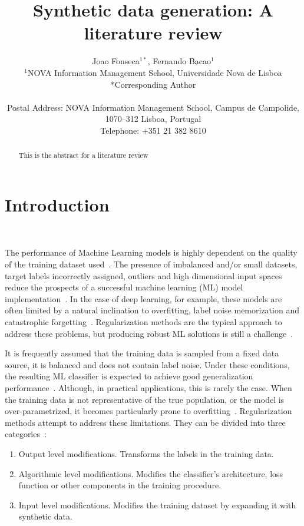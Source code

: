 \documentclass[parskip=full]{scrartcl}
\title{Synthetic data generation: A literature review}
\author{%
	Joao Fonseca\(^{1*}\), Fernando Bacao\(^{1}\)
	\\
	\small{\(^{1}\)NOVA Information Management School, Universidade Nova de Lisboa}
	\\
	\small{*Corresponding Author}
	\\
	\\
	\small{Postal Address: NOVA Information Management School, Campus de
    Campolide, 1070--312 Lisboa, Portugal}
	\\
	\small{Telephone: +351 21 382 8610}
}
\date{}
\begin{document}
\maketitle

\begin{abstract}

    This is the abstract for a literature review

\end{abstract}

\section{Introduction}~\label{sec:introduction}



The performance of Machine Learning models is highly dependent on the quality
of the training dataset used~\cite{Fenza2021, Halevy2009}. The presence of
imbalanced and/or small datasets, target labels incorrectly assigned, outliers
and high dimensional input spaces reduce the prospects of a successful machine
learning (ML) model implementation~\cite{Halevy2009, Domingos2012,
Salman2019}. In the case of deep learning, for example, these
models are often limited by a natural inclination to overfitting, label noise
memorization and catastrophic forgetting~\cite{Xie2021}. Regularization
methods are the typical approach to address these problems, but producing
robust ML solutions is still a challenge~\cite{Zhang2021}.

It is frequently assumed that the training data is sampled from a fixed data
source, it is balanced and does not contain label noise. Under these
conditions, the resulting ML classifier is expected to achieve good
generalization performance~\cite{benning2018modern}. Although, in practical
applications, this is rarely the case. When the training data is not
representative of the true population, or the model is over-parametrized, it
becomes particularly prone to overfitting~\cite{Bartlett2021}. Regularization
methods attempt to address these limitations. They can be divided into three
categories~\cite{santos2022avoiding}:

\begin{enumerate}
    \item Output level modifications. Transforms the labels in the training
        data.
    \item Algorithmic level modifications. Modifies the classifier's
        architecture, loss function or other components in the training
        procedure.
    \item Input level modifications. Modifies the training dataset by expanding it
        with synthetic data.
\end{enumerate}
\end{document}

